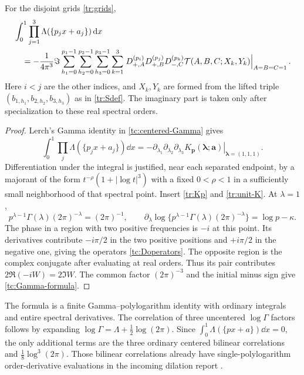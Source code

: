 \begin{theorem}
\label{tc:Gamma-triple}
For the disjoint grids \eqref{tr:grids},
\begin{align}
 &\int_0^1\prod_{j=1}^3\Lambda(\{p_jx+a_j\})\,\mathrm d x
  \notag\\
 &\quad=-\frac1{4\pi^3}\Im
   \sum_{h_1=0}^{p_1-1}\sum_{h_2=0}^{p_2-1}\sum_{h_3=0}^{p_3-1}
   \sum_{k=1}^3
   \left.
       D_{+,A}^{(p_i)}D_{+,B}^{(p_j)}D_{-,C}^{(p_k)}
       \mathcal T(A,B,C;X_k,Y_k)
   \right|_{A=B=C=1}.
   \label{tc:Gamma-formula}
\end{align}
Here $i<j$ are the other indices, and $X_k,Y_k$ are formed from the
lifted triple $(b_{1,h_1},b_{2,h_2},b_{3,h_3})$ as in
\eqref{tr:Sdef}. The imaginary part is taken only after specialization
to these real spectral orders.
\end{theorem}
\begin{proof}
Lerch's Gamma identity in \eqref{tc:centered-Gamma} gives
\[
 \int_0^1\prod_j\Lambda(\{p_jx+a_j\})\dd x
  =-\left.\partial_{\lambda_1}\partial_{\lambda_2}
               \partial_{\lambda_3}
          K_{\boldsymbol p}(\boldsymbol\lambda;\boldsymbol a)
           \right|_{\boldsymbol\lambda=(1,1,1)}.
\]
Differentiation under the integral is justified, near each separated
endpoint, by a majorant of the form
$t^{-\rho}(1+|\log t|^3)$ with a fixed $0<\rho<1$ in a sufficiently
small neighborhood of that spectral point. Insert
\eqref{tr:Kp} and \eqref{tr:unit-K}. At $\lambda=1$,
\[
 p^{\lambda-1}\Gamma(\lambda)(2\pi)^{-\lambda}=(2\pi)^{-1},
 \qquad
 \partial_\lambda\log\{p^{\lambda-1}\Gamma(\lambda)
                  (2\pi)^{-\lambda}\}=\log p-\kappa.
\]
The phase in a region with two positive frequencies is $-i$ at this
point. Its derivatives contribute $-i\pi/2$ in the two positive
positions and $+i\pi/2$ in the negative one, giving the operators
\eqref{tc:Doperators}. The opposite region is the complex conjugate
after evaluating at real orders. Thus its pair contributes
$2\Re(-iW)=2\Im W$. The common factor $(2\pi)^{-3}$ and the initial
minus sign give \eqref{tc:Gamma-formula}.
\end{proof}

The formula is a finite Gamma--polylogarithm identity with ordinary
integrals and entire spectral derivatives. The correlation of three
uncentered $\log\Gamma$ factors follows by expanding
$\log\Gamma=\Lambda+\tfrac12\log(2\pi)$. Since
$\int_0^1\Lambda(\{px+a\})\dd x=0$, the only additional terms are
the three ordinary centered bilinear correlations and
$\tfrac18\log^3(2\pi)$. Those bilinear correlations already have
single-polylogarithm order-derivative evaluations in the incoming
dilation report \cite{incoming-sh}.

